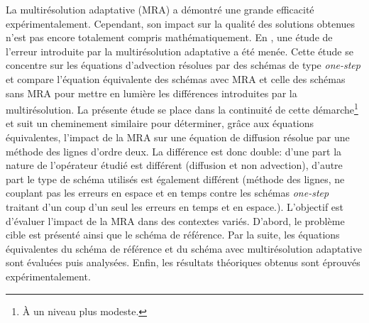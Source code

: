 La multirésolution adaptative (MRA) a démontré une grande efficacité expérimentalement.\label{par:intro_contrib_eq_equiv}
Cependant, son impact sur la qualité des solutions obtenues n'est pas encore totalement compris mathématiquement.
En \cite{belloti_et_al_2025}, une étude de l'erreur introduite par la multirésolution adaptative a été menée.
Cette étude se concentre sur les équations d'advection résolues par des schémas de type \textit{one-step} \cite{DARU2004563} et
compare l'équation équivalente des schémas avec MRA et celle des schémas sans MRA pour mettre en lumière les différences introduites par la multirésolution.
La présente étude se place dans la continuité de cette démarche\footnote{À un niveau plus modeste.} et suit un cheminement similaire
pour déterminer, grâce aux équations équivalentes, l'impact de la MRA sur une équation de diffusion résolue par une méthode des lignes d'ordre deux.
La différence est donc double: d'une part la nature de l'opérateur étudié est différent (diffusion et non advection), d'autre part le type de schéma 
utilisés est également différent (méthode des lignes, ne couplant pas les erreurs en espace et en temps contre les schémas \textit{one-step} 
traitant d'un coup d'un seul les erreurs en temps et en espace.). L'objectif est d'évaluer l'impact de la MRA dans des contextes variés.
D'abord, le problème cible est présenté ainsi que le schéma de référence.
Par la suite, les équations équivalentes du schéma de référence et du schéma avec multirésolution adaptative sont évaluées puis analysées.
Enfin, les résultats théoriques obtenus sont éprouvés expérimentalement.